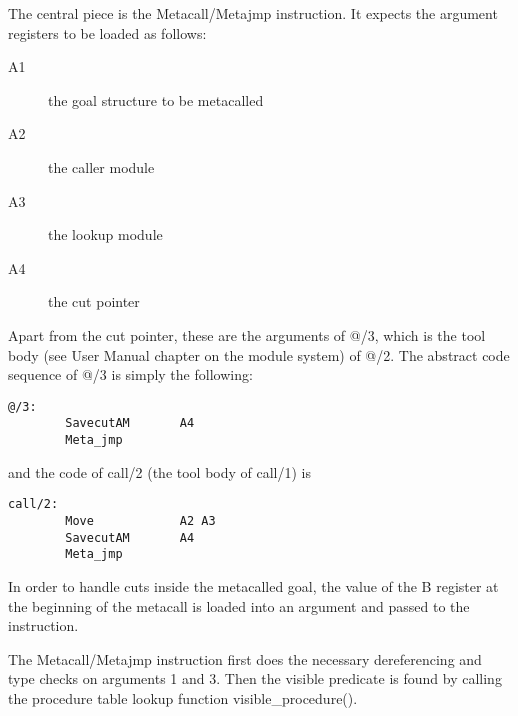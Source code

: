 The central piece is the Metacall/Metajmp instruction.
It expects the argument registers to be loaded as follows:
\begin{description}
\item[A1] the goal structure to be metacalled
\item[A2] the caller module
\item[A3] the lookup module
\item[A4] the cut pointer
\end{description}
Apart from the cut pointer, these are the arguments of @/3, which is
the tool body (see User Manual chapter on the module system) of @/2.
The abstract code sequence of @/3 is simply the following:
\begin{verbatim}
@/3:
        SavecutAM       A4
        Meta_jmp
\end{verbatim}
and the code of call/2 (the tool body of call/1) is
\begin{verbatim}
call/2:
        Move            A2 A3
        SavecutAM       A4
        Meta_jmp
\end{verbatim}
In order to handle cuts inside the metacalled goal, the value of the B
register at the beginning of the metacall is loaded into an argument
and passed to the instruction.

The Metacall/Metajmp instruction first does the necessary dereferencing
and type checks on arguments 1 and 3.
Then the visible predicate is found by calling
the procedure table lookup function visible_procedure().


